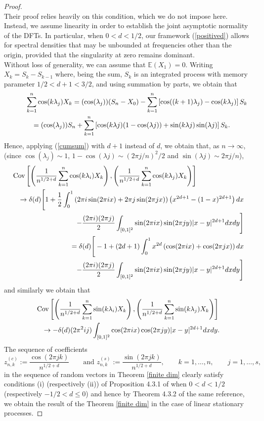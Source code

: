 \documentclass[12pt]{article}
\numberwithin{equation}{section}
\begin{document}
\begin{proof}
\[\]
Their proof relies heavily on this condition, which we do not impose here. Instead, we assume linearity in order to establish the joint asymptotic normality of the DFTs. In particular, when $0<d<1/2$, our framework (\ref{positived}) allows for spectral densities that may be unbounded at frequencies other than the origin, provided that the singularity at zero remains dominant.\\
Without loss of generality, we can assume that $\mathbb{E}(X_1)=0$. Writing $X_k=S_k-S_{k-1}$ where, being the sum, $S_k$ is an integrated  process with memory parameter $1/2<d+1<3/2$, and using summation by parts, we obtain that 
\begin{eqnarray}\label{expansion}\lefteqn{
\sum_{k=1}^n\cos(k\lambda_{j})X_k=(\cos(\lambda_j))(S_n-X_0)-\sum_{k=1}^n\left[\cos((k+1)\lambda_j)-\cos(k\lambda_j)\right]S_k}\nonumber\\
&&=(\cos(\lambda_j))S_n+
\sum_{k=1}^n\left[\cos(k\lambda j)(1-\cos(\lambda j))+\sin(k\lambda j)\sin(\lambda j)\right]S_k.
\end{eqnarray}
Hence,  applying (\ref{cumsum}) with $d+1$ instead of $d$, we obtain that, as $n\to\infty$, (since  $\cos(\lambda_j)\sim1$, $1-\cos(\lambda j)\sim(2\pi j/n)^2/2$ and $\sin(\lambda j)\sim2\pi j/n$),
\begin{eqnarray}\label{match2}\lefteqn{
    \textrm{Cov}\left[\left(\frac{1} {n^{1/2+d}}\sum_{k=1}^n\cos(k\lambda_{i})X_k\right),\left(\frac{1}{n^{1/2+d}}\sum_{k=1}^n\cos(k\lambda_{j})X_k\right)\right]}\\
&&
\to\delta(d)\Bigg[1+\frac{1}{2}\int_0^1\left(2\pi i\sin(2\pi ix)+2\pi j\sin(2\pi jx)\right)\left(x^{2d+1}-(1-x)^{2d+1}\right)dx\nonumber\\
&&-\frac{(2\pi i)(2\pi j)}{2}\int_{[0,1]^2}\sin(2\pi ix)\sin(2\pi jy)\vert x- y\vert^{2d+1}dxdy\Bigg]\nonumber\\
&&=\delta(d)\Bigg[-1+(2d+1)\int_0^1x^{2d}\left(\cos(2\pi ix)+\cos(2\pi jx)\right)dx\nonumber\\
&&-\frac{(2\pi i)(2\pi j)}{2}\int_{[0,1]^2}\sin(2\pi ix)\sin(2\pi jy)\vert x- y\vert^{2d+1}dxdy\Bigg]
\end{eqnarray}
and similarly we obtain that
\begin{eqnarray*}\lefteqn{
    \textrm{Cov}\left[\left(\frac{1} {n^{1/2+d}}\sum_{k=1}^n\sin(k\lambda_{i})X_k\right),\left(\frac{1}{n^{1/2+d}}\sum_{k=1}^n\sin(k\lambda_{j})X_k\right)\right]}\\
&&\to-\delta(d)(2\pi^2 ij)\int_{[0,1]^2}\cos(2\pi ix)\cos(2\pi jy)\vert x- y\vert^{2d+1}dxdy.
\end{eqnarray*}
The sequence of coefficients 
$$
z^{(c)}_{n,k}:=\frac{\cos(2\pi jk)}{n^{1/2+d}}\qquad\textrm{and }z^{(s)}_{n,k}:=\frac{\sin(2\pi jk)}{n^{1/2+d}},\qquad k=1,\ldots,n,\qquad j=1,\ldots,s,
$$
in the sequence of random vectors in Theorem \ref{finite dim} clearly 
satisfy conditions (i)  (respectively (ii)) of Proposition 4.3.1 of  \cite{MR2977317} when $0<d<1/2$ (respectively $-1/2<d\le0$) and hence by Theorem 4.3.2 of the same reference, we obtain the result  of the Theorem \ref{finite dim} in the case of linear stationary processes. 
\end{proof}
\end{document}
